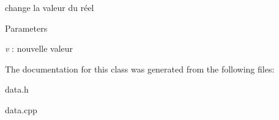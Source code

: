 change la valeur du réel 


\begin{DoxyParams}{Parameters}
\item[{\em v}]: nouvelle valeur \end{DoxyParams}


The documentation for this class was generated from the following files:\begin{DoxyCompactItemize}
\item 
data.h\item 
data.cpp\end{DoxyCompactItemize}
